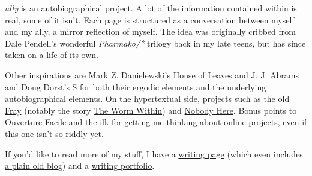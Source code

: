 \emph{ally} is an autobiographical project. A lot of the information contained within is real, some of it isn't. Each page is structured as a conversation between myself and my ally, a mirror reflection of myself. The idea was originally cribbed from Dale Pendell's wonderful \emph{Pharmako/*} trilogy back in my late teens, but has since taken on a life of its own.

Other inspirations are Mark Z. Danielewski's {House} of Leaves and J. J. Abrams and Doug Dorst's S for both their ergodic elements and the underlying autobiographical elements. On the hypertextual side, projects such as the old \href{http://fray.com/index-old.shtml}{Fray} (notably the story \href{https://fray.com/drugs/worm/}{The Worm Within}) and \href{https://nobodyhere.com}{Nobody Here}. Bonus points to \href{http://www.ouverture-facile.com/}{Ouverture Facile} and the ilk for getting me thinking about online projects, even if this one isn't so riddly yet.

If you'd like to read more of my stuff, I have a \href{https://writing.drab-makyo.com}{writing page} (which even includes \href{https://writing.drab-makyo.com/blog/}{a plain old blog}) and a \href{https://makyo.ink}{writing portfolio}.
